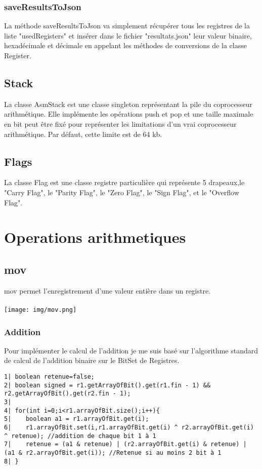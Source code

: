 \documentclass{article}
\begin{document}
\subsubsection{saveResultsToJson}

La méthode saveResultsToJson va simplement récupérer tous les registres de la liste "usedRegisters" et insérer dans le fichier "resultats.json"
leur valeur binaire, hexadécimale et décimale en appelant les méthodes de conversions de la classe Register.


\subsection{Stack}

La classe AsmStack est une classe singleton représentant la pile du coprocesseur arithmétique. Elle implémente les opérations push et pop et
une taille maximale en bit peut être fixé pour représenter les limitations d'un vrai coprocesseur arithmétique. Par défaut, cette limite est de 64 kb.

\subsection{Flags}

La classe Flag est une classe registre particulière qui représente 5 drapeaux,le "Carry Flag", le "Parity Flag", le "Zero Flag", le "Sign Flag", et le "Overflow Flag".

\section{Operations arithmetiques}
\subsection{mov}
mov permet l'enregistrement d'une valeur entière dans un registre.
\\
\\
\texttt{[image: img/mov.png]}

\newpage
\subsubsection{Addition}
Pour implémenter le calcul de l'addition je me suis basé sur l'algorithme standard de calcul de l'addition binaire sur le BitSet de Registres.

\begin{verbatim}
1| boolean retenue=false;
2| boolean signed = r1.getArrayOfBit().get(r1.fin - 1) && r2.getArrayOfBit().get(r2.fin - 1);
3|
4| for(int i=0;i<r1.arrayOfBit.size();i++){
5|    boolean a1 = r1.arrayOfBit.get(i);
6|    r1.arrayOfBit.set(i,r1.arrayOfBit.get(i) ^ r2.arrayOfBit.get(i) ^ retenue); //addition de chaque bit 1 à 1
7|    retenue = (a1 & retenue) | (r2.arrayOfBit.get(i) & retenue) | (a1 & r2.arrayOfBit.get(i)); //Retenue si au moins 2 bit à 1
8| }
\end{verbatim}
\end{document}
